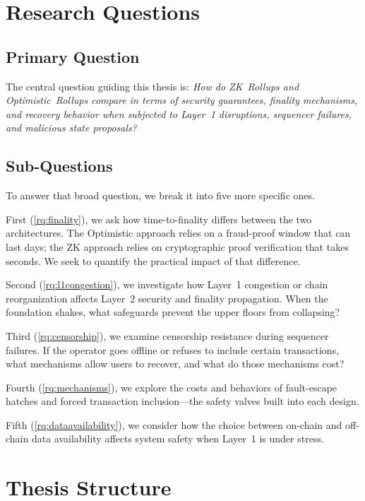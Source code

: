 \section{Research Questions}

\subsection{Primary Question}

The central question guiding this thesis is: \textit{How do ZK~Rollups and Optimistic~Rollups compare in terms of security guarantees, finality mechanisms, and recovery behavior when subjected to Layer~1 disruptions, sequencer failures, and malicious state proposals?}

\subsection{Sub-Questions}

To answer that broad question, we break it into five more specific ones.

First (\ref{rq:finality}), \label{rq:finality} we ask how time-to-finality differs between the two architectures. The Optimistic approach relies on a fraud-proof window that can last days; the ZK approach relies on cryptographic proof verification that takes seconds. We seek to quantify the practical impact of that difference.

Second (\ref{rq:l1congestion}), \label{rq:l1congestion} we investigate how Layer~1 congestion or chain reorganization affects Layer~2 security and finality propagation. When the foundation shakes, what safeguards prevent the upper floors from collapsing?

Third (\ref{rq:censorship}), \label{rq:censorship} we examine censorship resistance during sequencer failures. If the operator goes offline or refuses to include certain transactions, what mechanisms allow users to recover, and what do those mechanisms cost?

Fourth (\ref{rq:mechanisms}), \label{rq:mechanisms} we explore the costs and behaviors of fault-escape hatches and forced transaction inclusion---the safety valves built into each design.

Fifth (\ref{rq:dataavailability}), \label{rq:dataavailability} we consider how the choice between on-chain and off-chain data availability affects system safety when Layer~1 is under stress.

\section{Thesis Structure}

